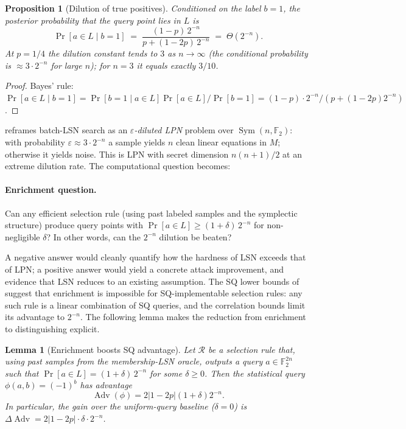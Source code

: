 \documentclass[11pt,a4paper]{article}
\theoremstyle{plain}
\newtheorem{lemma}[theorem]{Lemma}
\newtheorem{proposition}[theorem]{Proposition}
\theoremstyle{definition}
\newcommand{\F}{\mathbb{F}}
\begin{document}
\begin{proposition}[Dilution of true positives]
\label{prop:dilution}
Conditioned on the label $b=1$, the posterior probability that the query point lies in $L$ is
\[
\Pr[a \in L \mid b=1] \;=\; \frac{(1-p)\,2^{-n}}{p + (1-2p)\,2^{-n}} \;=\; \Theta(2^{-n}).
\]
At $p=1/4$ the dilution constant tends to $3$ as $n\to\infty$ (the conditional probability is $\approx 3\cdot 2^{-n}$ for large $n$); for $n=3$ it equals exactly $3/10$.
\end{proposition}

\begin{proof}
Bayes' rule: $\Pr[a \in L \mid b=1] = \Pr[b=1 \mid a \in L]\Pr[a \in L] / \Pr[b=1] = (1-p)\cdot 2^{-n} / (p + (1-2p)2^{-n})$.
\end{proof}

 reframes batch-LSN search as an \emph{$\varepsilon$-diluted LPN} problem over $\operatorname{Sym}(n,\F_2)$: with probability $\varepsilon \approx 3\cdot 2^{-n}$ a sample yields $n$ clean linear equations in $M$; otherwise it yields noise.  This is LPN with secret dimension $n(n+1)/2$ at an extreme dilution rate.  The computational question becomes:

\paragraph{Enrichment question.}
\label{q:enrichment}
Can any efficient selection rule (using past labeled samples and the symplectic structure) produce query points with $\Pr[a \in L] \geq (1+\delta)\,2^{-n}$ for non-negligible $\delta$?  In other words, can the $2^{-n}$ dilution be beaten?

A negative answer would cleanly quantify how the hardness of LSN exceeds that of LPN; a positive answer would yield a concrete attack improvement, and evidence that LSN reduces to an existing assumption.  The SQ lower bounds of  suggest that enrichment is impossible for SQ-implementable selection rules: any such rule is a linear combination of SQ queries, and the correlation bounds limit its advantage to $2^{-n}$. The following lemma makes the reduction from enrichment to distinguishing explicit.

\begin{lemma}[Enrichment boosts SQ advantage]
\label{lem:enrichment-sq}
Let $\mathcal{R}$ be a selection rule that, using past samples from the membership-LSN oracle, outputs a query $a \in \F_2^{2n}$ such that $\Pr[a \in L] = (1+\delta)\,2^{-n}$ for some $\delta \ge 0$. Then the statistical query $\phi(a,b) = (-1)^b$ has advantage
\[
  \operatorname{Adv}(\phi) = 2|1-2p|(1+\delta)2^{-n}.
\]
In particular, the gain over the uniform-query baseline ($\delta=0$) is $\Delta\operatorname{Adv} = 2|1-2p|\cdot\delta\cdot 2^{-n}$.
\end{lemma}
\end{document}
